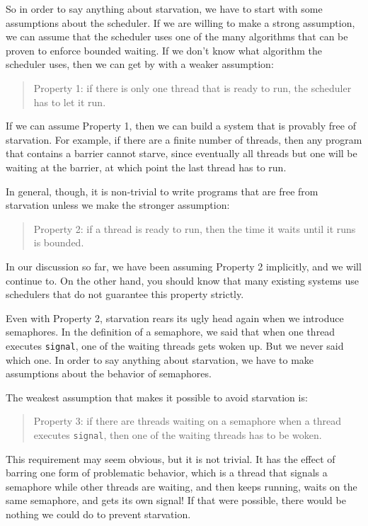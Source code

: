 \documentclass{book}
\begin{document}
So in order to say anything about starvation, we have to start
with some assumptions about the scheduler.  If we are willing
to make a strong assumption, we can assume that the scheduler
uses one of the many algorithms that can be proven to enforce
bounded waiting.  If we don't know what algorithm the scheduler
uses, then we can get by with a weaker assumption:

\begin{quote}
    Property 1: if there is only one thread that is ready to
    run, the scheduler has to let it run.
\end{quote}

If we can assume Property 1, then we can build a system
that is provably free of starvation.  For example, if there
are a finite number of threads, then any program that contains
a barrier cannot starve, since eventually all threads but one
will be waiting at the barrier, at which point the last thread
has to run.

In general, though, it is non-trivial to write programs that
are free from starvation unless we make the stronger
assumption:

\begin{quote}
    Property 2: if a thread is ready to run, then the time it
    waits until it runs is bounded.
\end{quote}

In our discussion so far, we have been assuming Property 2
implicitly, and we will continue to.  On the other hand,
you should know that many existing systems use schedulers
that do not guarantee this property strictly.

Even with Property 2, starvation rears its ugly head again
when we introduce semaphores.  In the definition of a semaphore,
we said that when one thread executes {\tt signal}, one of
the waiting threads gets woken up.  But we never said which one.
In order to say anything about starvation, we have to
make assumptions about the behavior of semaphores.

The weakest assumption that makes it possible to avoid
starvation is:

\begin{quote}
    Property 3: if there are threads waiting on a semaphore when
    a thread executes {\tt signal}, then one of the waiting threads
    has to be woken.
\end{quote}

This requirement may seem obvious, but it is not trivial.  It has the
effect of barring one form of problematic behavior, which is a thread
that signals a semaphore while other threads are waiting, and then
keeps running, waits on the same semaphore, and gets its own signal!
If that were possible, there would be nothing we
could do to prevent starvation.
\end{document}

